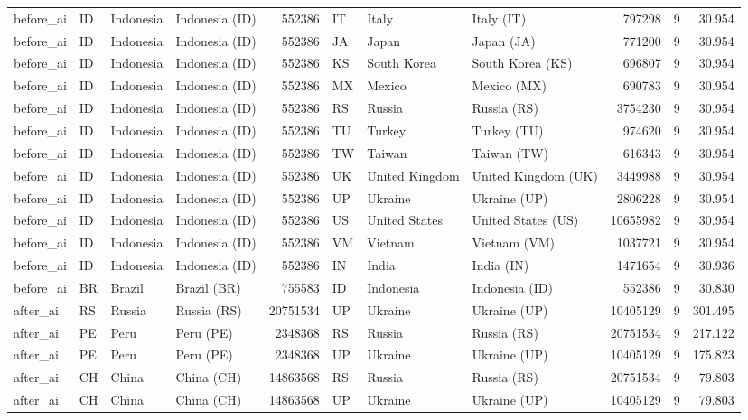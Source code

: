 \begin{tabular}{llllrlllrrr}
before\_ai & ID & Indonesia & Indonesia (ID) & 552386 & IT & Italy & Italy (IT) & 797298 & 9 & 30.954 \\
before\_ai & ID & Indonesia & Indonesia (ID) & 552386 & JA & Japan & Japan (JA) & 771200 & 9 & 30.954 \\
before\_ai & ID & Indonesia & Indonesia (ID) & 552386 & KS & South Korea & South Korea (KS) & 696807 & 9 & 30.954 \\
before\_ai & ID & Indonesia & Indonesia (ID) & 552386 & MX & Mexico & Mexico (MX) & 690783 & 9 & 30.954 \\
before\_ai & ID & Indonesia & Indonesia (ID) & 552386 & RS & Russia & Russia (RS) & 3754230 & 9 & 30.954 \\
before\_ai & ID & Indonesia & Indonesia (ID) & 552386 & TU & Turkey & Turkey (TU) & 974620 & 9 & 30.954 \\
before\_ai & ID & Indonesia & Indonesia (ID) & 552386 & TW & Taiwan & Taiwan (TW) & 616343 & 9 & 30.954 \\
before\_ai & ID & Indonesia & Indonesia (ID) & 552386 & UK & United Kingdom & United Kingdom (UK) & 3449988 & 9 & 30.954 \\
before\_ai & ID & Indonesia & Indonesia (ID) & 552386 & UP & Ukraine & Ukraine (UP) & 2806228 & 9 & 30.954 \\
before\_ai & ID & Indonesia & Indonesia (ID) & 552386 & US & United States & United States (US) & 10655982 & 9 & 30.954 \\
before\_ai & ID & Indonesia & Indonesia (ID) & 552386 & VM & Vietnam & Vietnam (VM) & 1037721 & 9 & 30.954 \\
before\_ai & ID & Indonesia & Indonesia (ID) & 552386 & IN & India & India (IN) & 1471654 & 9 & 30.936 \\
before\_ai & BR & Brazil & Brazil (BR) & 755583 & ID & Indonesia & Indonesia (ID) & 552386 & 9 & 30.830 \\
after\_ai & RS & Russia & Russia (RS) & 20751534 & UP & Ukraine & Ukraine (UP) & 10405129 & 9 & 301.495 \\
after\_ai & PE & Peru & Peru (PE) & 2348368 & RS & Russia & Russia (RS) & 20751534 & 9 & 217.122 \\
after\_ai & PE & Peru & Peru (PE) & 2348368 & UP & Ukraine & Ukraine (UP) & 10405129 & 9 & 175.823 \\
after\_ai & CH & China & China (CH) & 14863568 & RS & Russia & Russia (RS) & 20751534 & 9 & 79.803 \\
after\_ai & CH & China & China (CH) & 14863568 & UP & Ukraine & Ukraine (UP) & 10405129 & 9 & 79.803 \\

\end{tabular}
